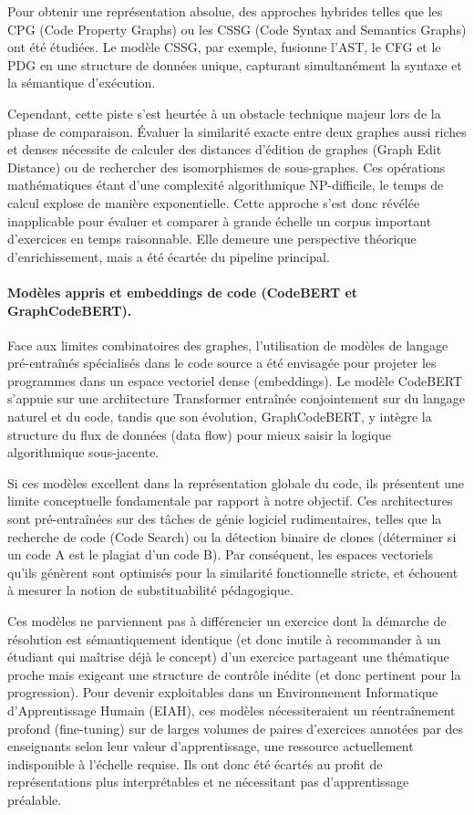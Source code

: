 \documentclass[12pt,a4paper,oneside]{report}
\begin{document}
Pour obtenir une représentation absolue, des approches hybrides telles que les CPG (Code Property Graphs) ou les CSSG (Code Syntax and Semantics Graphs) ont été étudiées. Le modèle CSSG, par exemple, fusionne l'AST, le CFG et le PDG en une structure de données unique, capturant simultanément la syntaxe et la sémantique d'exécution.

Cependant, cette piste s'est heurtée à un obstacle technique majeur lors de la phase de comparaison. Évaluer la similarité exacte entre deux graphes aussi riches et denses nécessite de calculer des distances d'édition de graphes (Graph Edit Distance) ou de rechercher des isomorphismes de sous-graphes. Ces opérations mathématiques étant d'une complexité algorithmique NP-difficile, le temps de calcul explose de manière exponentielle. Cette approche s'est donc révélée inapplicable pour évaluer et comparer à grande échelle un corpus important d'exercices en temps raisonnable. Elle demeure une perspective théorique d'enrichissement, mais a été écartée du pipeline principal.

\paragraph{Modèles appris et embeddings de code (CodeBERT et GraphCodeBERT).}

Face aux limites combinatoires des graphes, l'utilisation de modèles de langage pré-entraînés spécialisés dans le code source a été envisagée pour projeter les programmes dans un espace vectoriel dense (embeddings). Le modèle CodeBERT s'appuie sur une architecture Transformer entraînée conjointement sur du langage naturel et du code, tandis que son évolution, GraphCodeBERT, y intègre la structure du flux de données (data flow) pour mieux saisir la logique algorithmique sous-jacente.

Si ces modèles excellent dans la représentation globale du code, ils présentent une limite conceptuelle fondamentale par rapport à notre objectif. Ces architectures sont pré-entraînées sur des tâches de génie logiciel rudimentaires, telles que la recherche de code (Code Search) ou la détection binaire de clones (déterminer si un code A est le plagiat d'un code B). Par conséquent, les espaces vectoriels qu'ils génèrent sont optimisés pour la similarité fonctionnelle stricte, et échouent à mesurer la notion de substituabilité pédagogique.

Ces modèles ne parviennent pas à différencier un exercice dont la démarche de résolution est sémantiquement identique (et donc inutile à recommander à un étudiant qui maîtrise déjà le concept) d'un exercice partageant une thématique proche mais exigeant une structure de contrôle inédite (et donc pertinent pour la progression). Pour devenir exploitables dans un Environnement Informatique d'Apprentissage Humain (EIAH), ces modèles nécessiteraient un réentraînement profond (fine-tuning) sur de larges volumes de paires d'exercices annotées par des enseignants selon leur valeur d'apprentissage, une ressource actuellement indisponible à l'échelle requise. Ils ont donc été écartés au profit de représentations plus interprétables et ne nécessitant pas d'apprentissage préalable.
\end{document}
